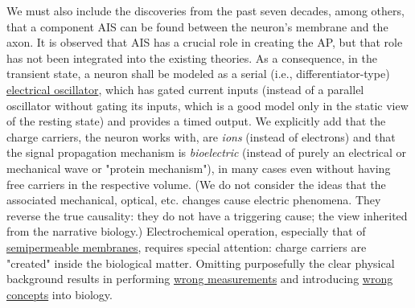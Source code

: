 \ifx\magyar\undefined
We must also include the discoveries from the past seven decades,
among others, that a component \gls{AIS} can be found between the neuron's membrane and the axon. It is observed that \gls{AIS} has a crucial role in creating the \gls{AP}, but
that role has not been integrated into the existing theories.
As a consequence, in the transient state, a neuron shall be modeled
as a serial (i.e., differentiator-type) \hyperlink{PhysicsOscillator}
{electrical oscillator}, which has gated current 
inputs (instead of a parallel oscillator 
without gating its inputs, which is a good model only in the static view of the resting state) and provides a timed output. We explicitly add that the charge carriers, the neuron 
works with, are \textit{ions} (instead of electrons) and that the signal propagation
mechanism is \textit{bioelectric} (instead of purely an electrical
or mechanical wave or "protein mechanism"), in many cases even without having free carriers in the respective volume. (We do not consider the
ideas that the associated mechanical, optical, etc. changes cause electric phenomena. They reverse the true causality: they do not have 
a triggering cause; the view inherited from the narrative biology.)
Electrochemical operation,
especially that of \hyperlink{ThermodynamicElectricField}{semipermeable membranes}, requires special attention: 
charge carriers are "created" inside the biological matter.
Omitting purposefully the clear physical background results in performing
\hyperlink{voltage-clamping}{wrong measurements} and introducing \hyperlink{PhysiologyFallacy}{wrong concepts} into biology.

\else

